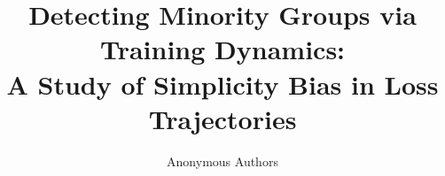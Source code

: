 \documentclass[letterpaper]{article}
\title{Detecting Minority Groups via Training Dynamics:\\A Study of Simplicity Bias in Loss Trajectories}
\author{Anonymous Authors}
\date{}
\begin{document}
\maketitle

\begin{abstract}

\end{abstract}











\end{document}
